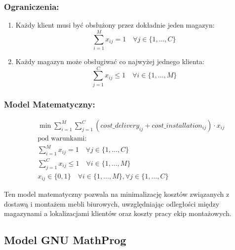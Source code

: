 \subsubsection*{Ograniczenia:}

\begin{enumerate}
    \item Każdy klient musi być obsłużony przez dokładnie jeden magazyn:
          \[
              \sum_{i=1}^{M} x_{ij} = 1 \quad \forall j \in \{1, \ldots, C\}
          \]

    \item Każdy magazyn może obsługiwać co najwyżej jednego klienta:
          \[
              \sum_{j=1}^{C} x_{ij} \leq 1 \quad \forall i \in \{1, \ldots, M\}
          \]
\end{enumerate}

\subsubsection*{Model Matematyczny:}

\[
    \begin{aligned}
         & \min \sum_{i=1}^{M} \sum_{j=1}^{C} (cost\_delivery_{ij} + cost\_installation_{ij}) \cdot x_{ij} \\
         & \text{pod warunkami:}                                                                           \\
         & \sum_{i=1}^{M} x_{ij} = 1 \quad \forall j \in \{1, \ldots, C\}                                  \\
         & \sum_{j=1}^{C} x_{ij} \leq 1 \quad \forall i \in \{1, \ldots, M\}                               \\
         & x_{ij} \in \{0, 1\} \quad \forall i \in \{1, \ldots, M\}, \forall j \in \{1, \ldots, C\}
    \end{aligned}
\]

Ten model matematyczny pozwala na minimalizację kosztów związanych z dostawą i montażem mebli biurowych, uwzględniając odległości między magazynami a lokalizacjami klientów oraz koszty pracy ekip montażowych.
\subsection{Model GNU MathProg}


